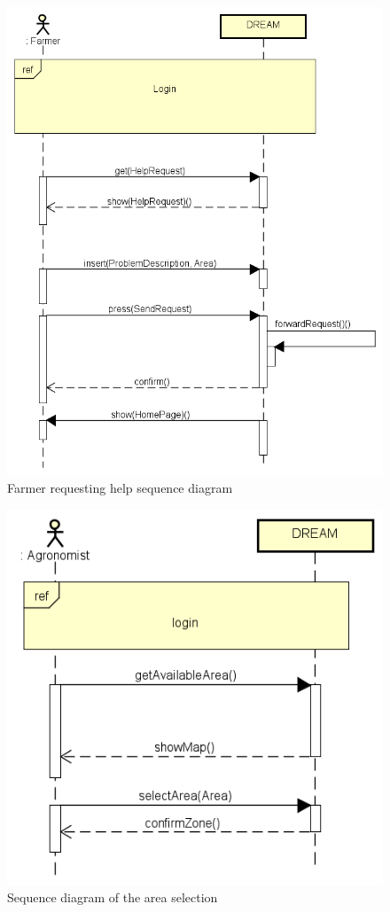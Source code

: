 \bigskip
\begin{figure}[H]
    \centering
    \includegraphics[scale=0.7]{Images/helpRequest.png}
    \caption{Farmer requesting help sequence diagram}
\end{figure}

\bigskip
\begin{figure}[H]
    \centering
    \includegraphics[scale=0.7]{Images/AgronomistSelectDataSequence.png}
    \caption{Sequence diagram of the area selection}
\end{figure}

